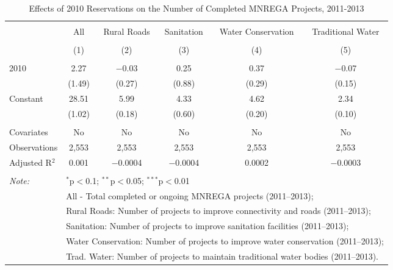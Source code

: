
\begin{table}[!htbp] \centering 
  \caption{Effects of 2010 Reservations on the Number of Completed MNREGA Projects, 2011-2013} 
  \label{main_mnrega_10} 
\scriptsize 
\begin{tabular}{@{\extracolsep{1pt}}lccccc} 
\\[-1.8ex]\hline 
\hline \\[-1.8ex] 
 & All & Rural Roads & Sanitation & Water Conservation & Traditional Water \\ 
\\[-1.8ex] & (1) & (2) & (3) & (4) & (5)\\ 
\hline \\[-1.8ex] 
 2010 & 2.27 & $-$0.03 & 0.25 & 0.37 & $-$0.07 \\ 
  & (1.49) & (0.27) & (0.88) & (0.29) & (0.15) \\ 
  Constant & 28.51 & 5.99 & 4.33 & 4.62 & 2.34 \\ 
  & (1.02) & (0.18) & (0.60) & (0.20) & (0.10) \\ 
 \hline \\[-1.8ex] 
Covariates & No & No & No & No & No \\ 
Observations & 2,553 & 2,553 & 2,553 & 2,553 & 2,553 \\ 
Adjusted R$^{2}$ & 0.001 & $-$0.0004 & $-$0.0004 & 0.0002 & $-$0.0003 \\ 
\hline 
\hline \\[-1.8ex] 
\textit{Note:}  & \multicolumn{5}{l}{$^{*}$p$<$0.1; $^{**}$p$<$0.05; $^{***}$p$<$0.01} \\ 
 & \multicolumn{5}{l}{All - Total completed or ongoing MNREGA projects (2011--2013);} \\ 
 & \multicolumn{5}{l}{Rural Roads: Number of projects to improve connectivity and roads (2011--2013);} \\ 
 & \multicolumn{5}{l}{Sanitation:  Number of projects to improve sanitation facilities  (2011--2013);} \\ 
 & \multicolumn{5}{l}{Water Conservation: Number of projects to improve water conservation (2011--2013);} \\ 
 & \multicolumn{5}{l}{Trad. Water: Number of projects to maintain traditional water bodies (2011--2013).} \\ 
\end{tabular} 
\end{table} 

